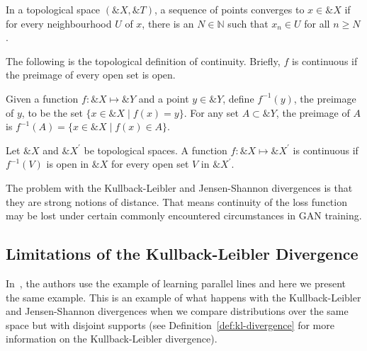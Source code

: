 \begin{definition}%
  \label{def:convergence-topological-space}
  In a topological space $(\&X, \&T)$, a sequence of points
  \textnormal{\sffamily converges} to $x \in \&X$ if for every neighbourhood $U$
  of $x$, there is an $N \in \mathbb{N}$ such that $x_n \in U$ for all $n \geq
  N$.
\end{definition}

The following is the topological definition of continuity. Briefly,
$f$ is continuous if the preimage of every open set is open.

\begin{definition}%
  \label{def:pre-image}
  Given a function $f: \&X \mapsto \&Y$ and a point $y \in \&Y$, define
  $f^{-1}(y)$, the \textnormal{\sffamily preimage} of $y$, to be the set $\{x
  \in \&X \mid f(x) = y\}$. For any set $A \subset \&Y$, the preimage of $A$ is
  $f^{-1}(A) = \{x \in \&X \mid f(x) \in A\}$.
\end{definition}

\begin{definition}%
  \label{def:continuity-topological-space}
  Let $\&X$ and $\&X^\prime$ be topological spaces. A function $f: \&X \mapsto
  \&X^\prime$ is \textnormal{\sffamily continuous} if $f^{-1}(V)$ is open in
  $\&X$ for every open set $V$ in $\&X^\prime$.
\end{definition}

The problem with the Kullback-Leibler and Jensen-Shannon divergences is that
they are strong notions of distance. That means continuity of the loss function
may be lost under certain commonly encountered circumstances in GAN training.

\subsection{Limitations of the Kullback-Leibler Divergence}

In~\cite{ref:arjovsky-2017}, the authors use the example of learning parallel
lines and here we present the same example. This is an example of what happens
with the Kullback-Leibler and Jensen-Shannon divergences when we compare
distributions over the same space but with disjoint supports (see
Definition~\ref{def:kl-divergence} for more information on the Kullback-Leibler
divergence).

